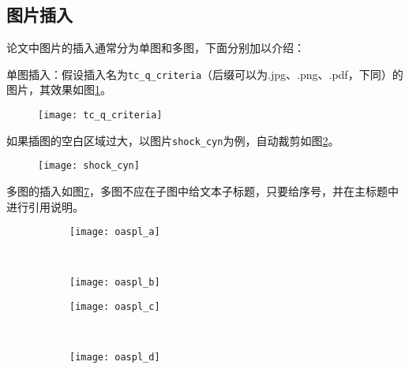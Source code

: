 \subsection{图片插入}

论文中图片的插入通常分为单图和多图，下面分别加以介绍：

单图插入：假设插入名为\verb|tc_q_criteria|（后缀可以为.jpg、.png、.pdf，下同）的图片，其效果如图\ref{fig:tc_q_criteria}。
\begin{figure}[!htbp]
    \centering
    \texttt{[image: tc\_q\_criteria]}
    \label{fig:tc_q_criteria}
\end{figure}

如果插图的空白区域过大，以图片\verb|shock_cyn|为例，自动裁剪如图\ref{fig:shock_cyn}。
\begin{figure}[!htbp]
    \centering
    \texttt{[image: shock\_cyn]}
    \label{fig:shock_cyn}
\end{figure}

多图的插入如图\ref{fig:oaspl}，多图不应在子图中给文本子标题，只要给序号，并在主标题中进行引用说明。
\begin{figure}[!htbp]
    \centering
    \begin{subfigure}[b]{0.35\textwidth}
      \texttt{[image: oaspl\_a]}
      \caption{}
      \label{fig:oaspl_a}
    \end{subfigure}%
    ~%
    \begin{subfigure}[b]{0.35\textwidth}
      \texttt{[image: oaspl\_b]}
      \caption{}
      \label{fig:oaspl_b}
    \end{subfigure}
    \begin{subfigure}[b]{0.35\textwidth}
      \texttt{[image: oaspl\_c]}
      \caption{}
      \label{fig:oaspl_c}
    \end{subfigure}%
    ~%
    \begin{subfigure}[b]{0.35\textwidth}
      \texttt{[image: oaspl\_d]}
      \caption{}
      \label{fig:oaspl_d}
    \end{subfigure}
    \label{fig:oaspl}
\end{figure}

